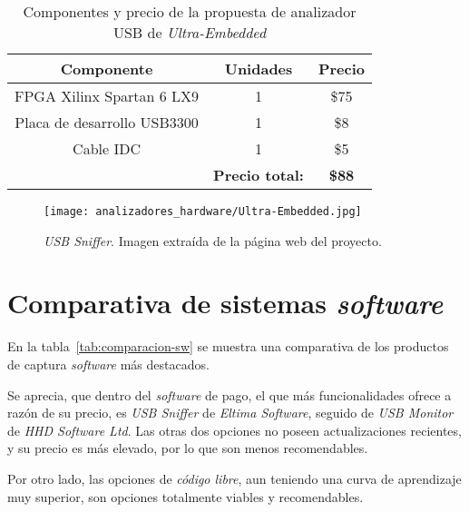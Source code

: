 \begin{itemize}
    \begin{table}[hbtp]
        \centering
        \caption{Componentes y precio de la propuesta de analizador USB de \emph{Ultra-Embedded}}
        \label{tab:precio-ultra-embedded}
        \begin{tabular}{|c|c|c|}
            \hline
            \textbf{Componente} &
            \textbf{Unidades} &
            \textbf{Precio} \\ \hline
            \hline

            FPGA Xilinx Spartan 6 LX9 &
            1 & \$75 \\ \hline

            Placa de desarrollo USB3300 &
            1 &
            \$8 \\ \hline

            Cable IDC &
            1 &
            \$5 \\ \hline
            
            \multicolumn{1}{r}{} &
            \multicolumn{1}{c}{\textbf{Precio total:}} &
            \multicolumn{1}{c}{\textbf{\$88}} \\
        \end{tabular}
    \end{table}

    \begin{figure}[hbtp]
        \centering
        \texttt{[image: analizadores\_hardware/Ultra-Embedded.jpg]}
        \caption{\emph{USB Sniffer}. Imagen extraída de la página web del proyecto.}
        \label{fig:ultra-embedded}
    \end{figure}
\end{itemize}


\newpage
\section{Comparativa de sistemas \emph{software}}
En la tabla~\ref{tab:comparacion-sw} se muestra una comparativa de los productos de captura \emph{software} más destacados.

Se aprecia, que dentro del \emph{software} de pago, el que más funcionalidades ofrece a razón de su precio, es \emph{USB Sniffer} de \emph{Eltima Software}, seguido de \emph{USB Monitor} de \emph{HHD Software Ltd}. Las otras dos opciones no poseen actualizaciones recientes, y su precio es más elevado, por lo que son menos recomendables.

Por otro lado, las opciones de \emph{código libre}, aun teniendo una curva de aprendizaje muy superior, son opciones totalmente viables y recomendables.

